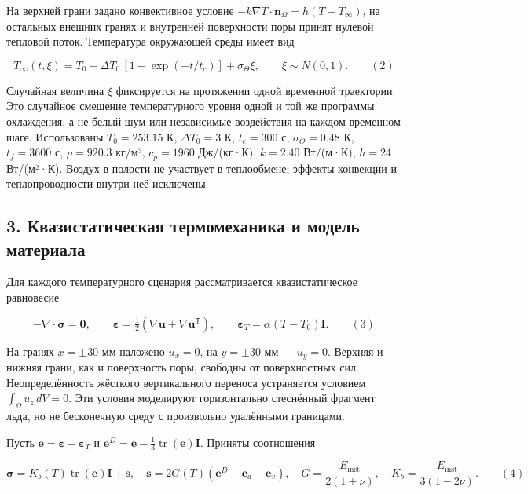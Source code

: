 \documentclass[
]{article}
\begin{document}
На верхней грани задано конвективное условие
\(-k\nabla T\cdot\boldsymbol n_{\Omega}=h(T-T_\infty)\), на остальных
внешних гранях и внутренней поверхности поры принят нулевой тепловой
поток. Температура окружающей среды имеет вид

\[
T_\infty(t,\xi)=T_0-\Delta T_0\,[1-\exp(-t/t_c)]+\sigma_\Theta\xi,\qquad \xi\sim N(0,1). \qquad(2)
\]

Случайная величина \(\xi\) фиксируется на протяжении одной временной
траектории. Это случайное смещение температурного уровня одной и той же
программы охлаждения, а не белый шум или независимые воздействия на
каждом временном шаге. Использованы \(T_0=253.15\) К, \(\Delta T_0=3\)
К, \(t_c=300\) с, \(\sigma_\Theta=0.48\) К, \(t_f=3600\) с,
\(\rho=920.3\) кг/м³, \(c_p=1960\) Дж/(кг·К), \(k=2.40\) Вт/(м·К),
\(h=24\) Вт/(м²·К). Воздух в полости не участвует в теплообмене; эффекты
конвекции и теплопроводности внутри неё исключены.

\subsection{3. Квазистатическая термомеханика и модель
материала}\label{ux43aux432ux430ux437ux438ux441ux442ux430ux442ux438ux447ux435ux441ux43aux430ux44f-ux442ux435ux440ux43cux43eux43cux435ux445ux430ux43dux438ux43aux430-ux438-ux43cux43eux434ux435ux43bux44c-ux43cux430ux442ux435ux440ux438ux430ux43bux430}

Для каждого температурного сценария рассматривается квазистатическое
равновесие

\[
-\nabla\cdot\boldsymbol\sigma=\boldsymbol0,\qquad
\boldsymbol\varepsilon=\tfrac12(\nabla\boldsymbol u+\nabla\boldsymbol u^{\mathsf T}),\qquad
\boldsymbol\varepsilon_T=\alpha(T-T_0)\boldsymbol I. \qquad(3)
\]

На гранях \(x=\pm30\) мм наложено \(u_x=0\), на \(y=\pm30\) мм ---
\(u_y=0\). Верхняя и нижняя грани, как и поверхность поры, свободны от
поверхностных сил. Неопределённость жёсткого вертикального переноса
устраняется условием \(\int_\Omega u_z\,dV=0\). Эти условия моделируют
горизонтально стеснённый фрагмент льда, но не бесконечную среду с
произвольно удалёнными границами.

Пусть \(\boldsymbol e=\boldsymbol\varepsilon-\boldsymbol\varepsilon_T\)
и
\(\boldsymbol e^{D}=\boldsymbol e-\tfrac13\operatorname{tr}(\boldsymbol e)\boldsymbol I\).
Приняты соотношения

\[
\boldsymbol\sigma=K_b(T)\operatorname{tr}(\boldsymbol e)\boldsymbol I+\boldsymbol s,\quad
\boldsymbol s=2G(T)(\boldsymbol e^{D}-\boldsymbol e_d-\boldsymbol e_v),\quad
G=\frac{E_{\mathrm{inst}}}{2(1+\nu)},\quad K_b=\frac{E_{\mathrm{inst}}}{3(1-2\nu)}. \qquad(4)
\]
\end{document}
